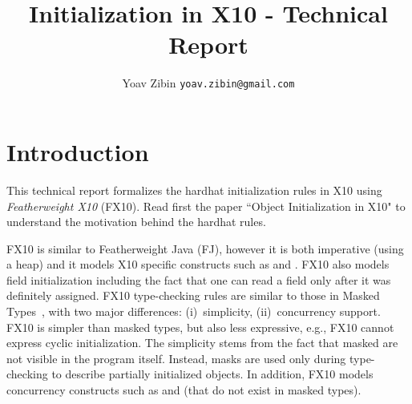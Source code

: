 \documentclass[a4paper]{article}
\title{Initialization in X10 - Technical Report}
\author{Yoav Zibin \texttt{yoav.zibin@gmail.com}}
\date{}
\begin{document}
\maketitle


\lstset{language=java,basicstyle=\ttfamily\small}

\section{Introduction}
This technical report formalizes the hardhat initialization rules in X10
    using \emph{Featherweight X10} (FX10).
Read first the paper ``Object Initialization in X10" to understand the motivation behind the hardhat rules.

FX10 is similar to Featherweight Java (FJ), however it is both imperative (using a heap) and it
    models X10 specific constructs such as \finish and \async.
FX10 also models field initialization including the fact that one can read a field only after it was definitely assigned.
FX10 type-checking rules are similar to those in Masked Types~\cite{XinQi:2009},
    with two major differences:
    (i)~simplicity,
    (ii)~concurrency support.
FX10 is simpler than masked types, but also less expressive, e.g., FX10 cannot express cyclic initialization.
The simplicity stems from the fact that masked are not visible in the program itself.
Instead, masks are used only during type-checking to describe partially initialized objects.
In addition, FX10 models concurrency constructs such as \finish and \async (that do not exist in masked types).
\end{document}
